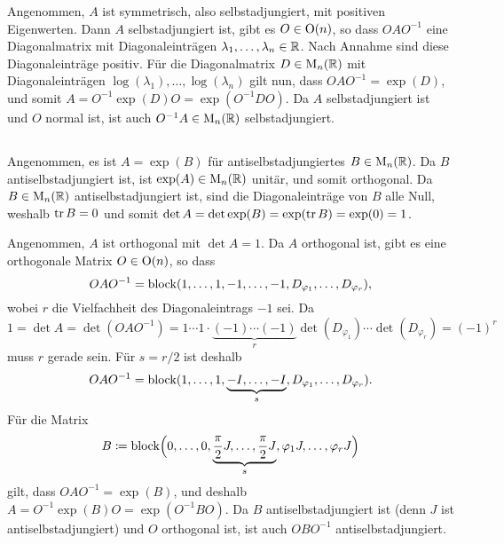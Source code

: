 \documentclass[a4paper, 10pt, numbers=noenddot]{scrartcl}
\begin{document}
Angenommen, $A$ ist symmetrisch, also selbstadjungiert, mit positiven Eigenwerten.
Dann $A$ selbstadjungiert ist, gibt es $O \in \operatorname{O}(n)$, so dass $O A O^{-1}$ eine Diagonalmatrix mit Diagonaleinträgen $\lambda_1, \dotsc, \lambda_n \in \mathbb{R}$.
Nach Annahme sind diese Diagonaleinträge positiv.
Für die Diagonalmatrix $D \in \operatorname{M}_n(\mathbb{R})$ mit Diagonaleinträgen $\log(\lambda_1), \dotsc, \log(\lambda_n)$ gilt nun, dass $O A O^{-1} = \exp(D)$, und somit $A = O^{-1} \exp(D) O = \exp(O^{-1} D O)$.
Da $A$ selbstadjungiert ist und $O$ normal ist, ist auch $O^{-1} A \in \operatorname{M}_n(\mathbb{R})$ selbstadjungiert.





\subsection{}

Angenommen, es ist $A = \exp(B)$ für antiselbstadjungiertes $B \in \operatorname{M}_n(\mathbb{R})$.
Da $B$ antiselbstadjungiert ist, ist $\exp(A) \in \operatorname{M}_n(\mathbb{R})$ unitär, und somit orthogonal.
Da $B \in \operatorname{M}_n(\mathbb{R})$ antiselbstadjungiert ist, sind die Diagonaleinträge von $B$ alle Null, weshalb $\operatorname{tr} B = 0$ und somit $\det A = \det \exp(B) = \exp(\operatorname{tr} B) = \exp(0) = 1$.

Angenommen, $A$ ist orthogonal mit $\det A = 1$.
Da $A$ orthogonal ist, gibt es eine orthogonale Matrix $O \in \operatorname{O}(n)$, so dass
\[
    O A O^{-1}
  = \operatorname{\operatorname{block}}(1, \dotsc, 1, -1, \dotsc, -1, D_{\varphi_1}, \dotsc, D_{\varphi_r}),
\]
wobei $r$ die Vielfachheit des Diagonaleintrags $-1$ sei.
Da
\[
    1
  = \det A
  = \det(O A O^{-1})
  = 1 \dotsm 1 \cdot \underbrace{(-1) \dotsm (-1)}_{r} \det(D_{\varphi_1}) \dotsm \det(D_{\varphi_r})
  = (-1)^r
\]
muss $r$ gerade sein.
Für $s = r/2$ ist deshalb
\[
    O A O^{-1}
  = \operatorname{\operatorname{block}}(1, \dotsc, 1, \underbrace{-I, \dotsc, -I}_{s}, D_{\varphi_1}, \dotsc, D_{\varphi_r}).
\]
Für die Matrix
\[
            B
  \coloneqq \operatorname{\operatorname{block}}\Bigl(0, \dotsc, 0,
                        \underbrace{\frac{\pi}{2} J, \dotsc, \frac{\pi}{2} J}_{s},
                        \varphi_1 J, \dotsc, \varphi_r J
                  \Bigr)
\]
gilt, dass $O A O^{-1} = \exp(B)$, und deshalb $A = O^{-1} \exp(B) O = \exp(O^{-1} B O)$.
Da $B$ antiselbstadjungiert ist (denn $J$ ist antiselbstadjungiert) und $O$ orthogonal ist, ist auch $O B O^{-1}$ antiselbstadjungiert.





\subsection{}
\end{document}
